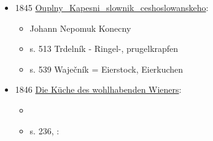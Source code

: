 \begin{itemize}
\begin{itemize}
    \begin{itemize}
    \tightlist
    \item
      to nebude trdelník, ale bábovka
    \end{itemize}
  \end{itemize}
\item
  1845
  \href{https://www.google.cz/books/edition/Ouplny_Kapesni_slownik_ceshoslowanskeho/i8dUAAAAcAAJ?hl=cs&gbpv=1&dq=trdeln\%C3\%ADk&pg=PA513&printsec=frontcover}{Ouplny\_Kapesni\_slownik\_ceshoslowanskeho}:

  \begin{itemize}
  \tightlist
  \item
    Johann Nepomuk Konecny
  \item
    s. 513 Trdelník - Ringel-, prugelkrapfen
  \item
    s. 539 Waječník = Eierstock, Eierkuchen
  \end{itemize}
\item
  1846
  \href{https://www.digital.wienbibliothek.at/wbrobv/content/titleinfo/3845891}{Die
  Küche des wohlhabenden Wieners}:

  \begin{itemize}
  \tightlist
  \item
     
  \item
    s. 236,  :


\end{itemize}
\end{itemize}
